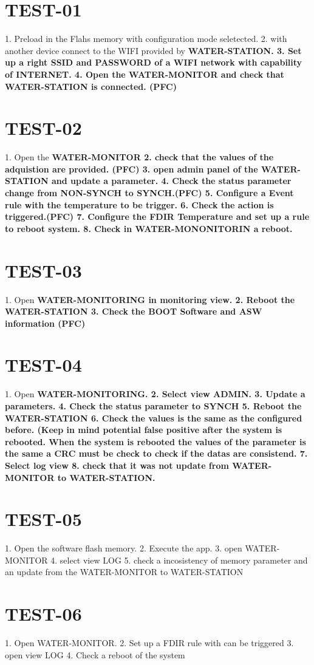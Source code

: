 \section{TEST-01}
1. Preload in the Flahs memory with configuration mode seletected.
2. with another device connect to the WIFI provided by \bf{WATER-STATION}.
3. Set up a right SSID and PASSWORD of a WIFI network with capability of INTERNET.
4. Open the \bf{WATER-MONITOR} and check that \bf{WATER-STATION} is connected. (PFC)
\section {TEST-02}
1. Open the \bf{WATER-MONITOR}
2. check that the values of the adquistion are provided. (PFC)
3. open admin panel of the \bf{WATER-STATION} and update a parameter.
4. Check the status parameter change from NON-SYNCH to SYNCH.(PFC)
5. Configure a Event rule with the temperature to be trigger.
6. Check the action is triggered.(PFC)
7. Configure the FDIR Temperature and set up a rule to reboot system.
8. Check in \bf{WATER-MONONITORIN} a reboot.

\section {TEST-03}
1. Open \bf{WATER-MONITORING} in monitoring view.
2. Reboot the \bf{WATER-STATION}
3. Check the BOOT Software and ASW information  (PFC)
\section {TEST-04}
1. Open \bf {WATER-MONITORING}.
2. Select view ADMIN.
3. Update a parameters.
4. Check the status parameter to SYNCH
5. Reboot the \bf{WATER-STATION}
6. Check the values is the same as the configured before. (Keep in mind potential false positive after the system is rebooted. When the system is rebooted the values of the parameter is the same a CRC must be check to check if the datas are consistend.
7. Select log view
8. check that it was not update from WATER-MONITOR to WATER-STATION.
\section {TEST-05}
1. Open the software flash memory.
2. Execute the app.
3. open WATER-MONITOR
4. select view LOG
5. check a incosistency of memory parameter and an update from the WATER-MONITOR to WATER-STATION
\section {TEST-06}
1. Open WATER-MONITOR.
2. Set up a FDIR rule with can be triggered
3. open view LOG
4. Check a reboot of the system

